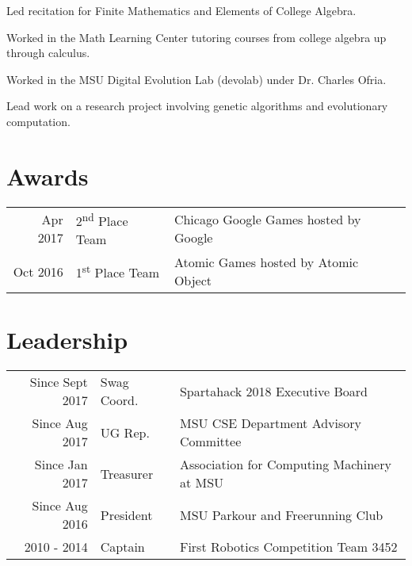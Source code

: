 \documentclass[]{deedy-resume-openfont}
\begin{document}
\begin{minipage}[t]{0.66\textwidth}
\begin{tightemize}
\item Led recitation for Finite Mathematics and Elements of College Algebra.
\item Worked in the Math Learning Center tutoring courses from college algebra up through calculus.
\end{tightemize}
\sectionsep

\begin{tightemize}
\item Worked in the MSU Digital Evolution Lab (devolab) under Dr. Charles Ofria.
\item Lead work on a research project involving genetic algorithms and evolutionary computation.
\end{tightemize}
\sectionsep


\section{Awards}

\begin{tabular}{rll}
Apr 2017 & 2\textsuperscript{nd} Place Team & Chicago Google Games hosted by Google\\
Oct 2016 & 1\textsuperscript{st} Place Team & Atomic Games hosted by Atomic Object\\
\end{tabular}
\sectionsep


\section{Leadership} 

\begin{tabular}{rll}
Since Sept 2017 & Swag Coord. & Spartahack 2018 Executive Board\\
Since Aug 2017 & UG Rep. & MSU CSE Department Advisory Committee\\
Since Jan 2017 & Treasurer & Association for Computing Machinery at MSU\\
Since Aug 2016 & President & MSU Parkour and Freerunning Club\\
2010 - 2014 & Captain & First Robotics Competition Team 3452
\end{tabular}
\sectionsep


\end{minipage}
\end{document}
